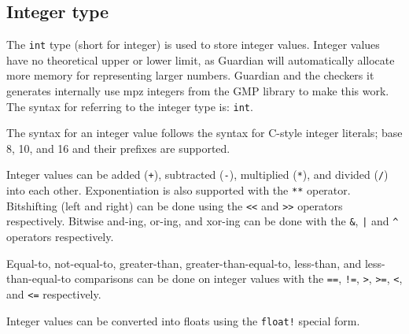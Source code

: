 
\subsection{Integer type}
{
	The \texttt{int} type (short for integer) is used to store integer values.
	Integer values have no theoretical upper or lower limit, as Guardian will
	automatically allocate more memory for representing larger numbers.
	Guardian and the checkers it generates internally
	use mpz integers from the GMP library to make this
	work.
	The syntax for referring to the integer type is: \texttt{int}.
	
	The syntax for an integer value follows the syntax for C-style integer
	literals; base 8, 10, and 16 and their prefixes are supported.
	
	Integer values can be added (\texttt{+}),
	subtracted (\texttt{-}), multiplied (\texttt{*}), and
	divided (\texttt{/}) into each
	other. Exponentiation is also supported
	with the \texttt{**} operator. Bitshifting (left and right) can be done
	using the \texttt{<<} and \texttt{>>} operators respectively.
	Bitwise and-ing, or-ing, and xor-ing can be done with the \texttt{\&},
	\texttt{|} and \texttt{\^} operators respectively.
	
	Equal-to, not-equal-to, greater-than, greater-than-equal-to,
	less-than, and less-than-equal-to comparisons
	can be done on integer values with
	the \texttt{==}, \texttt{!=},
	\texttt{>}, \texttt{>=}, \texttt{<}, and \texttt{<=} respectively.
	
	Integer values can be converted into floats using the \texttt{float!}
	special form.
}
